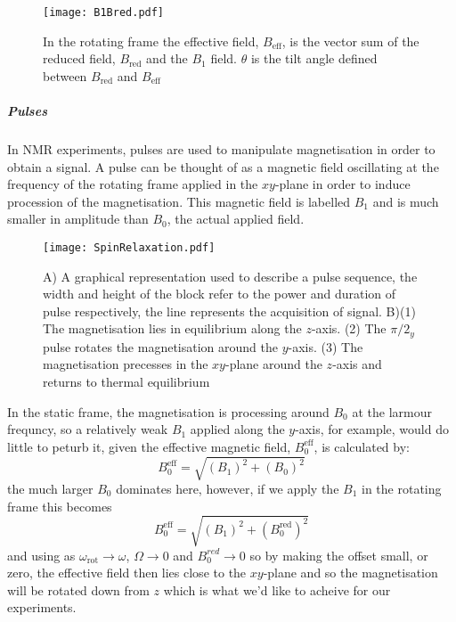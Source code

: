 \begin{figure}
  \begin{center}
  \texttt{[image: B1Bred.pdf]}
  \end{center}
  \caption{In the rotating frame the effective field, $B_{\text{eff}}$, is the vector sum of the reduced field,
  $B_{\text{red}}$ and the $B_1$ field. $\theta$ is the tilt angle defined between $B_{\text{red}}$ and $B_{\text{eff}}$}
  \label{fig:BMag}
\end{figure}


\subparagraph{Pulses}

In NMR experiments, pulses are used to manipulate magnetisation in order to obtain a signal. A pulse can be
thought of as a magnetic field oscillating at the frequency of the rotating frame
applied in the $xy$-plane in order to induce procession of the magnetisation. This magnetic field is labelled $B_1$ and is much smaller in amplitude than $B_0$, the actual applied field.

\begin{figure}
  \begin{center}
  \texttt{[image: SpinRelaxation.pdf]}
  \end{center}
  \caption{A) A graphical representation used to describe a pulse sequence, the width and height of the block
  refer to the power and duration of pulse respectively, the line represents the acquisition of signal. B)(1) The
  magnetisation lies in equilibrium along the $z$-axis. (2)  The $\pi/2_y$ pulse rotates the magnetisation around the $y$-axis. (3) The magnetisation precesses in the $xy$-plane around the $z$-axis and returns to thermal equilibrium}
  \label{fig:Pulse}
\end{figure}

In the static frame, the magnetisation is processing around $B_0$ at the larmour frequncy, so a relatively weak $B_1$ applied along the $y$-axis, for example, would do little to peturb it, given the effective magnetic field, $B^{\text{eff}}_0$, is calculated by:
\begin{equation}
  B^{\text{eff}}_0 = \sqrt{(B_1)^2+(B_0)^2}
\end{equation}
the much larger $B_0$ dominates here, however, if we apply the $B_1$ in the rotating
frame this becomes
\begin{equation}
  B^{\text{eff}}_0 = \sqrt{(B_1)^2+(B^{\text{red}}_0)^2}
\end{equation}
and using  as $\omega_{\text{rot}}\rightarrow\omega$, $\Omega\rightarrow0$ and $B^{red}_0\rightarrow0$ so by making the offset small, or zero, the effective field
then lies close to the $xy$-plane and so the magnetisation will be rotated down
from $z$ which is what we'd like to acheive for our experiments.


